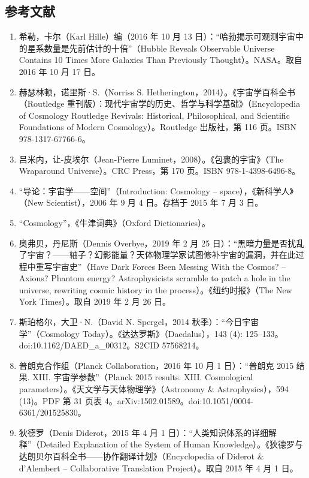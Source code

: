 \subsection{参考文献}
\begin{enumerate}
\item 希勒，卡尔（Karl Hille）编（2016 年 10 月 13 日）：“哈勃揭示可观测宇宙中的星系数量是先前估计的十倍”（Hubble Reveals Observable Universe Contains 10 Times More Galaxies Than Previously Thought）。NASA。取自 2016 年 10 月 17 日。  
\item 赫瑟林顿，诺里斯·S.（Norriss S. Hetherington，2014）。《宇宙学百科全书（Routledge 重刊版）：现代宇宙学的历史、哲学与科学基础》（Encyclopedia of Cosmology Routledge Revivals: Historical, Philosophical, and Scientific Foundations of Modern Cosmology）。Routledge 出版社，第 116 页。ISBN 978-1317-67766-6。  
\item 吕米内，让-皮埃尔（Jean-Pierre Luminet，2008）。《包裹的宇宙》（The Wraparound Universe）。CRC Press，第 170 页。ISBN 978-1-4398-6496-8。  
\item “导论：宇宙学——空间”（Introduction: Cosmology – space），《新科学人》（New Scientist），2006 年 9 月 4 日。存档于 2015 年 7 月 3 日。  
\item “Cosmology”，《牛津词典》（Oxford Dictionaries）。  
\item 奥弗贝，丹尼斯（Dennis Overbye，2019 年 2 月 25 日）：“黑暗力量是否扰乱了宇宙？——轴子？幻影能量？天体物理学家试图修补宇宙的漏洞，并在此过程中重写宇宙史”（Have Dark Forces Been Messing With the Cosmos? – Axions? Phantom energy? Astrophysicists scramble to patch a hole in the universe, rewriting cosmic history in the process）。《纽约时报》（The New York Times）。取自 2019 年 2 月 26 日。  
\item 斯珀格尔，大卫·N.（David N. Spergel，2014 秋季）：“今日宇宙学”（Cosmology Today）。《达达罗斯》（Daedalus），143 (4): 125–133。doi:10.1162/DAED\_a\_00312。S2CID 57568214。  
\item 普朗克合作组（Planck Collaboration，2016 年 10 月 1 日）：“普朗克 2015 结果. XIII. 宇宙学参数”（Planck 2015 results. XIII. Cosmological parameters）。《天文学与天体物理学》（Astronomy & Astrophysics），594 (13)。PDF 第 31 页表 4。arXiv:1502.01589。doi:10.1051/0004-6361/201525830。  
\item 狄德罗（Denis Diderot，2015 年 4 月 1 日）：“人类知识体系的详细解释”（Detailed Explanation of the System of Human Knowledge）。《狄德罗与达朗贝尔百科全书——协作翻译计划》（Encyclopedia of Diderot & d'Alembert – Collaborative Translation Project）。取自 2015 年 4 月 1 日。  

\end{enumerate}
